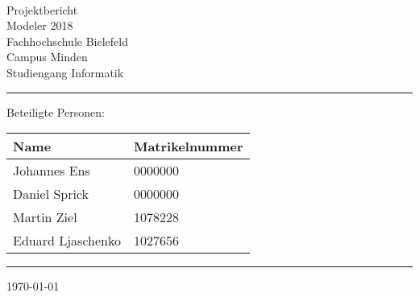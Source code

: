 


\begin{titlepage}
   \mbox{}\vspace{5\baselineskip}\\
   \sffamily\huge
   \centering
   {\Huge Projektbericht} \\
   \normalsize Modeler 2018
   \vspace{3\baselineskip}\\
   \rmfamily\Large
  Fachhochschule Bielefeld \\
  Campus Minden \\
  Studiengang Informatik
   \vspace{1\baselineskip}\\
\noindent\rule{15cm}{0.3pt}
Beteiligte Personen:
\begin{table}[H]
	\tablestyle
	\begin{tabular}{*{2}{v{0.45\textwidth}}}
		\hline
		\textbf{Name} &
		\textbf{Matrikelnummer} \tabularnewline
		\hline
		Johannes Ens & 0000000\tabularnewline
		Daniel Sprick & 0000000\tabularnewline
		Martin Ziel & 1078228\tabularnewline
		Eduard Ljaschenko& 1027656\tabularnewline

	\end{tabular}
\end{table}
   \noindent\rule{15cm}{0.4pt}

   \today
\end{titlepage}

